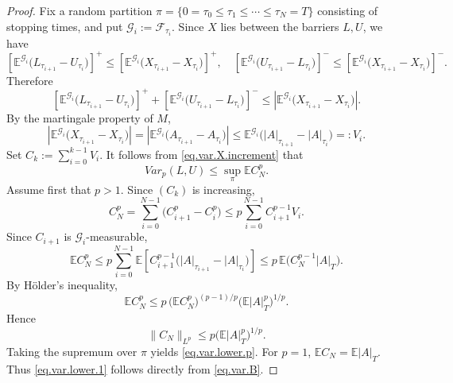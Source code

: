 \documentclass[11pt,a4paper,reqno]{amsart}
\theoremstyle{definition}
\numberwithin{equation}{section}
\begin{document}
\begin{proof}
Fix a random partition $\pi=\{0=\tau_0\leq\tau_1\leq\cdots\leq\tau_N=T\}$
consisting of stopping times, and put $\mathcal G_i:=\mathcal F_{\tau_i}$.
Since $X$ lies between the barriers $L,U$,  we have
\[
\left[\mathbb E^{\mathcal G_i}\big(L_{\tau_{i+1}}-U_{\tau_i}\big)\right]^+
\leq\left[\mathbb E^{\mathcal G_i}\big(X_{\tau_{i+1}}-X_{\tau_i}\big)\right]^+,\quad 
\left[
\mathbb E^{\mathcal G_i}
\big(U_{\tau_{i+1}}-L_{\tau_i}\big)
\right]^-
\leq
\left[
\mathbb E^{\mathcal G_i}
\big(X_{\tau_{i+1}}-X_{\tau_i}\big)
\right]^-.
\]
Therefore
\begin{equation}
\label{eq.var.X.increment}
\left[\mathbb E^{\mathcal G_i}\big(L_{\tau_{i+1}}-U_{\tau_i}\big)\right]^+
+\left[\mathbb E^{\mathcal G_i}\big(U_{\tau_{i+1}}-L_{\tau_i}\big)
\right]^-
\leq\left|\mathbb E^{\mathcal G_i}\big(X_{\tau_{i+1}}-X_{\tau_i}\big)\right|.
\end{equation}
By the martingale property of $M$,
\[
\left|\mathbb E^{\mathcal G_i}
\big(X_{\tau_{i+1}}-X_{\tau_i}\big)\right|
= 
\left|\mathbb E^{\mathcal G_i}
\big(A_{\tau_{i+1}}-A_{\tau_i}\big)\right|
\le 
\mathbb E^{\mathcal G_i}
\big(|A|_{\tau_{i+1}}-|A|_{\tau_i}\big)=:V_i.
\]
Set $C_k:=\sum_{i=0}^{k-1}V_i$.
It follows from \eqref{eq.var.X.increment} that
\begin{equation}\label{eq.var.B}
Var_p(L,U)
\leq
\sup_{\pi}\mathbb E C_N^p.
\end{equation}
Assume first that $p>1$. Since $(C_k)$ is increasing,
\[
C_N^p
=
\sum_{i=0}^{N-1}
\big(C_{i+1}^p-C_i^p\big)
\leq
p\sum_{i=0}^{N-1}C_{i+1}^{p-1}V_i.
\]
Since $C_{i+1}$ is $\mathcal G_i$-measurable,
\[
\mathbb E C_N^p\leq p\sum_{i=0}^{N-1} \mathbb E\left[C_{i+1}^{p-1}\big(|A|_{\tau_{i+1}}-|A|_{\tau_i}\big)\right]
\leq p\,\mathbb E\big(C_N^{p-1}|A|_T\big).
\]
By H\"older's inequality,
\[
\mathbb E C_N^p
\leq
p\,
\big(\mathbb E C_N^p\big)^{(p-1)/p}
\big(\mathbb E |A|_T^p\big)^{1/p}.
\]
Hence
\[
\|C_N\|_{L^p}
\leq
p\big(\mathbb E|A|_T^p\big)^{1/p}.
\]
Taking the supremum over $\pi$  yields
\eqref{eq.var.lower.p}.
For $p=1$, $\mathbb E C_N=\mathbb E|A|_T$.
Thus \eqref{eq.var.lower.1} follows directly from
\eqref{eq.var.B}.
\end{proof}
\end{document}
